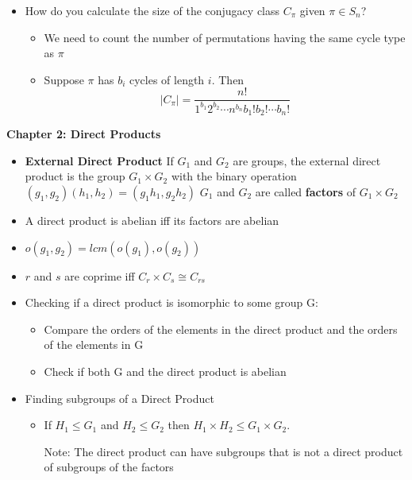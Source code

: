 \documentclass[a4paper, 12pt]
{article}
\begin{document}
\begin{itemize}
		\item How do you calculate the size of the conjugacy class $C_{\pi}$ given $\pi \in S_n$?
		
		\begin{itemize}
			\item We need to count the number of permutations having the same cycle type as $\pi$
			
			\item Suppose $\pi$ has $b_i$ cycles of length $i.$ Then
			$$|C_{\pi}| = \frac{n!}{1^{b_1} 2^{b_2} \cdots n^{b_n} b_1! b_2! \cdots b_n!}$$
		\end{itemize}
 	\end{itemize}
 	
 	\hfill
 	
 	\textbf{Chapter 2: Direct Products}
 	\begin{itemize}
 		\item \textbf{External Direct Product} If $G_1$ and $G_2$ are groups, the external direct product is the group $G_1 \times G_2$ with the binary operation $(g_1,g_2)(h_1,h_2)= (g_1h_1, g_2h_2)$ $G_1$ and $G_2$ are called \textbf{factors} of $G_1 \times G_2$
 		
 		\item A direct product is abelian iff its factors are abelian
 		
 		\item $o(g_1, g_2) = lcm(o(g_1), o(g_2))$
 		
 		\item $r$ and $s$ are coprime iff $C_r \times C_s \cong C_{rs}$
 		
 		\item Checking if a direct product is isomorphic to some group G:
 		
 		\begin{itemize}
 			\item Compare the orders of the elements in the direct product and the orders of the elements in G
 			
 			\item Check if both G and the direct product is abelian
 		\end{itemize}
 		\item Finding subgroups of a Direct Product
 		
 		\begin{itemize}
 			\item If $H_1 \le G_1$ and $H_2 \le G_2$ then $H_1 \times H_2 \le G_1 \times G_2.$
 			
 			Note:  The direct product can have  subgroups that is not a direct product of subgroups of the factors  
 		\end{itemize}
 	

\end{itemize}
\end{document}
